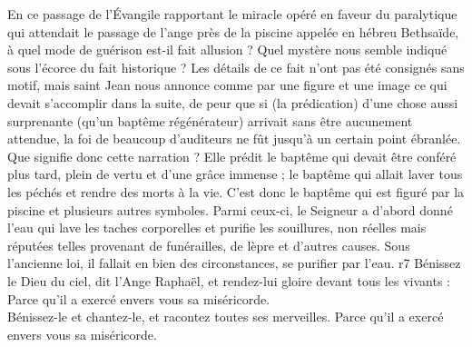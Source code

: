 \documentclass[twoside]{article}
\begin{document}
\begin{paracol}[1]{2}
{		En ce passage de l’Évangile rapportant le miracle opéré en faveur du paralytique qui attendait le passage de l’ange près de la piscine appelée en hébreu Bethsaïde, à quel mode de guérison est-il fait allusion ? Quel mystère nous semble indiqué sous l’écorce du fait historique ? Les détails de ce fait n’ont pas été consignés sans motif, mais saint Jean nous annonce comme par une figure et une image ce qui devait s’accomplir dans la suite, de peur que si (la prédication) d’une chose aussi surprenante (qu’un baptême régénérateur) arrivait sans être aucunement attendue, la foi de beaucoup d’auditeurs ne fût jusqu’à un certain point ébranlée. Que signifie donc cette narration ? Elle prédit le baptême qui devait être conféré plus tard, plein de vertu et d’une grâce immense ; le baptême qui allait laver tous les péchés et rendre des morts à la vie. C’est donc le baptême qui est figuré par la piscine et plusieurs autres symboles. Parmi ceux-ci, le Seigneur a d’abord donné l’eau qui lave les taches corporelles et purifie les souillures, non réelles mais réputées telles provenant de funérailles, de lèpre et d’autres causes. Sous l’ancienne loi, il fallait en bien des circonstances, se purifier par l’eau.
	}
	{r7}
	{\rr Bénissez le Dieu du ciel, dit l’Ange Raphaël, et rendez-lui gloire devant tous les vivants :\\
	\GreSpecial{*} Parce qu’il a exercé envers vous sa miséricorde.\\
	\vv Bénissez-le et chantez-le, et racontez toutes ses merveilles.
	\GreSpecial{*} Parce qu’il a exercé envers vous sa miséricorde.}
	

\end{paracol}
\end{document}
